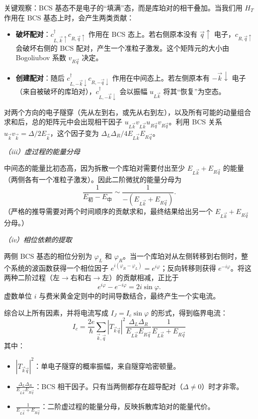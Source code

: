 关键观察：BCS 基态不是电子的``填满''态，而是库珀对的相干叠加。当我们用 $H_T$ 作用在 BCS 基态上时，会产生两类贡献：
\begin{itemize}[nosep]
    \item \textbf{破坏配对}：$c_{L,\vec{k}\uparrow}^\dagger c_{R,\vec{q}\uparrow}$ 作用在 BCS 态上。若右侧原本没有 $\vec{q}\uparrow$ 电子，$c_{R,\vec{q}\uparrow}$ 会破坏右侧的 BCS 配对，产生一个准粒子激发。这个矩阵元的大小由 Bogoliubov 系数 $v_{R\vec{q}}$ 决定。
    \item \textbf{创建配对}：随后 $c_{L,-\vec{k}\downarrow}^\dagger c_{R,-\vec{q}\downarrow}$ 作用在中间态上。若左侧原本有 $-\vec{k}\downarrow$ 电子（来自被破坏的库珀对），$c_{L,-\vec{k}\downarrow}^\dagger$ 会以振幅 $u_{L\vec{k}}$ 将其``恢复''为空态。
\end{itemize}

对两个方向的电子隧穿（先从左到右，或先从右到左），以及所有可能的动量组合求和后，总的矩阵元中会出现相干因子 $u_{L\vec{k}}v_{L\vec{k}} u_{R\vec{q}}v_{R\vec{q}}$。利用 BCS 关系 $u_{\vec{k}}v_{\vec{k}} = \Delta/2E_{\vec{k}}$，这个因子变为 $\Delta_L \Delta_R / 4E_{L\vec{k}}E_{R\vec{q}}$。

\textit{（iii）虚过程的能量分母}

中间态的能量比初态高，因为拆散一个库珀对需要付出至少 $E_{L\vec{k}} + E_{R\vec{q}}$ 的能量（两侧各有一个准粒子激发）。因此二阶微扰的能量分母为
\[
\frac{1}{E_{\text{初}} - E_{\text{中}}} \sim \frac{1}{-(E_{L\vec{k}} + E_{R\vec{q}})}.
\]
（严格的推导需要对两个时间顺序的贡献求和，最终结果给出另一个 $E_{L\vec{k}} + E_{R\vec{q}}$ 分母。）

\textit{（iv）相位依赖的提取}

两侧 BCS 基态的相位分别为 $\varphi_L$ 和 $\varphi_R$。当一个库珀对从左侧转移到右侧时，整个系统的波函数获得一个相位因子 $e^{i(\varphi_R - \varphi_L)} = e^{i\varphi}$；反向转移则获得 $e^{-i\varphi}$。将这两种二阶过程（左$\to$右和右$\to$左）的贡献相减，正比于
\[
e^{i\varphi} - e^{-i\varphi} = 2i\sin\varphi.
\]
虚数单位 $i$ 与费米黄金定则中的时间导数结合，最终产生一个实电流。

综合以上所有因素，并将电流写成 $I_J = I_c \sin\varphi$ 的形式，得到临界电流：
\[
I_c = \frac{2e}{\hbar} \sum_{\vec{k},\vec{q}} |T_{\vec{k}\vec{q}}|^2 \frac{\Delta_L \Delta_R}{E_{L\vec{k}} E_{R\vec{q}}} \frac{1}{E_{L\vec{k}} + E_{R\vec{q}}}
\]
其中：
\begin{itemize}[nosep]
    \item $|T_{\vec{k}\vec{q}}|^2$：单电子隧穿的概率振幅，来自隧穿哈密顿量。
    \item $\frac{\Delta_L \Delta_R}{E_{L\vec{k}} E_{R\vec{q}}}$：BCS 相干因子。只有当两侧都存在超导配对（$\Delta \neq 0$）时才非零。
    \item $\frac{1}{E_{L\vec{k}} + E_{R\vec{q}}}$：二阶虚过程的能量分母，反映拆散库珀对的能量代价。
\end{itemize}

